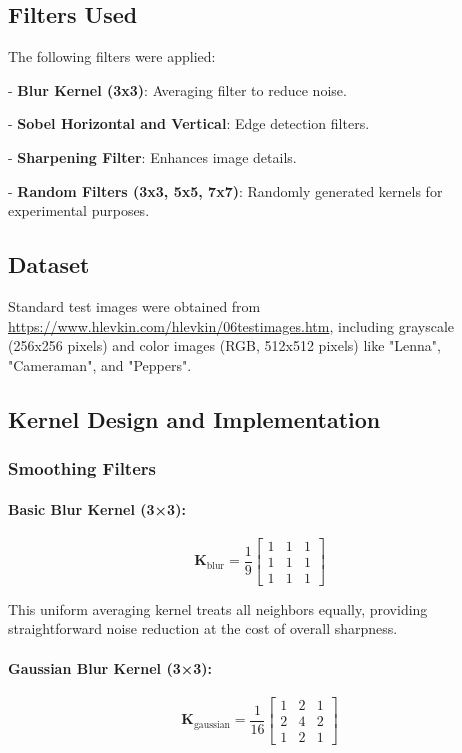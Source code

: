 \documentclass[12pt,a4paper]{article}
\newcommand{\kernel}[1]{\mathbf{K}_{\text{#1}}}
\begin{document}
	
	\subsection{Filters Used}
	The following filters were applied:
	
	
	- \textbf{Blur Kernel (3x3)}: Averaging filter to reduce noise.
	
	- \textbf{Sobel Horizontal and Vertical}: Edge detection filters.
	
	- \textbf{Sharpening Filter}: Enhances image details.
	
	- \textbf{Random Filters (3x3, 5x5, 7x7)}: Randomly generated kernels for experimental purposes.
	
	
	\subsection{Dataset}
	Standard test images were obtained from \url{https://www.hlevkin.com/hlevkin/06testimages.htm},  including grayscale (256x256 pixels) and color images (RGB, 512x512 pixels) like "Lenna", "Cameraman", and "Peppers".
	
	\subsection{Kernel Design and Implementation}
	
	\subsubsection{Smoothing Filters}
	
	\paragraph{Basic Blur Kernel (3×3):}
	\begin{equation}
		\kernel{blur} = \frac{1}{9} \begin{bmatrix} 
			1 & 1 & 1 \\
			1 & 1 & 1 \\
			1 & 1 & 1
		\end{bmatrix}
	\end{equation}
	
	This uniform averaging kernel treats all neighbors equally, providing straightforward noise reduction at the cost of overall sharpness.
	
	\paragraph{Gaussian Blur Kernel (3×3):}
	\begin{equation}
		\kernel{gaussian} = \frac{1}{16} \begin{bmatrix} 
			1 & 2 & 1 \\
			2 & 4 & 2 \\
			1 & 2 & 1
		\end{bmatrix}
	\end{equation}
	
\end{document}
